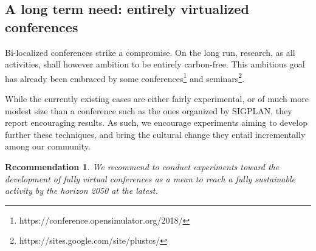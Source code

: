 \documentclass{scrartcl}
\newcommand{\yz}[1]{\textcolor{blue}{{[YZ:~#1]}}}
\newcommand{\yz}[1]{}
\newtheorem{recommend}{Recommendation}
\begin{document}
\subsection{A long term need: entirely virtualized conferences}

Bi-localized conferences strike a compromise. On the long run, research, as all
activities, shall however ambition to be entirely carbon-free. This ambitious
goal has already been embraced by some conferences\footnote{https://conference.opensimulator.org/2018/}
and seminars\footnote{https://sites.google.com/site/plustcs/}.

While the currently existing cases are either fairly experimental, or of much more
modest size than a conference such as the ones organized by SIGPLAN, they report
encouraging results. As such, we encourage experiments aiming to develop further
these techniques, and bring the cultural change they entail incrementally among
our community.

\begin{recommend}
  We recommend to conduct experiments toward the development of fully virtual
  conferences as a mean to reach a fully sustainable activity by the horizon 2050
  at the latest.
\end{recommend}





\end{document}
